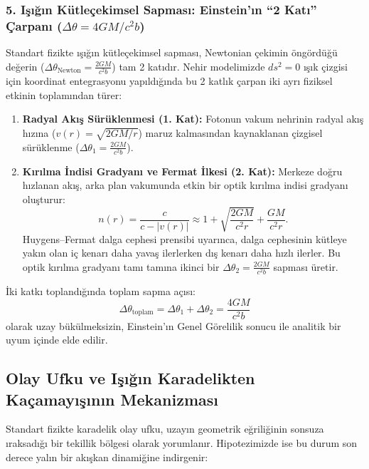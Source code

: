 \subsubsection{5. Işığın Kütleçekimsel Sapması: Einstein'ın ``2 Katı'' Çarpanı (\texorpdfstring{$\Delta\theta = 4GM/c^2 b$}{4GM/c2b})}
Standart fizikte ışığın kütleçekimsel sapması, Newtonian çekimin öngördüğü değerin ($\Delta\theta_{\mathrm{Newton}} = \frac{2GM}{c^2 b}$) tam 2 katıdır. Nehir modelimizde $ds^2 = 0$ ışık çizgisi için koordinat entegrasyonu yapıldığında bu 2 katlık çarpan iki ayrı fiziksel etkinin toplamından türer:
\begin{enumerate}
    \item \textbf{Radyal Akış Sürüklenmesi (1. Kat):} Fotonun vakum nehrinin radyal akış hızına ($v(r) = \sqrt{2GM/r}$) maruz kalmasından kaynaklanan çizgisel sürüklenme ($\Delta\theta_1 = \frac{2GM}{c^2 b}$).
    \item \textbf{Kırılma İndisi Gradyanı ve Fermat İlkesi (2. Kat):} Merkeze doğru hızlanan akış, arka plan vakumunda etkin bir optik kırılma indisi gradyanı oluşturur:
          \begin{equation}
              n(r) = \frac{c}{c - |v(r)|} \approx 1 + \sqrt{\frac{2GM}{c^2 r}} + \frac{GM}{c^2 r}.
          \end{equation}
          Huygens--Fermat dalga cephesi prensibi uyarınca, dalga cephesinin kütleye yakın olan iç kenarı daha yavaş ilerlerken dış kenarı daha hızlı ilerler. Bu optik kırılma gradyanı tamı tamına ikinci bir $\Delta\theta_2 = \frac{2GM}{c^2 b}$ sapması üretir.
\end{enumerate}
İki katkı toplandığında toplam sapma açısı:
\begin{equation}
    \Delta\theta_{\mathrm{toplam}} = \Delta\theta_1 + \Delta\theta_2 = \frac{4GM}{c^2 b}
    \label{eq:sapma_tam_ispat}
\end{equation}
olarak uzay bükülmeksizin, Einstein'ın Genel Görelilik sonucu ile analitik bir uyum içinde elde edilir.

\subsection{Olay Ufku ve Işığın Karadelikten Kaçamayışının Mekanizması}
Standart fizikte karadelik olay ufku, uzayın geometrik eğriliğinin sonsuza ıraksadığı bir tekillik bölgesi olarak yorumlanır. Hipotezimizde ise bu durum son derece yalın bir akışkan dinamiğine indirgenir:

